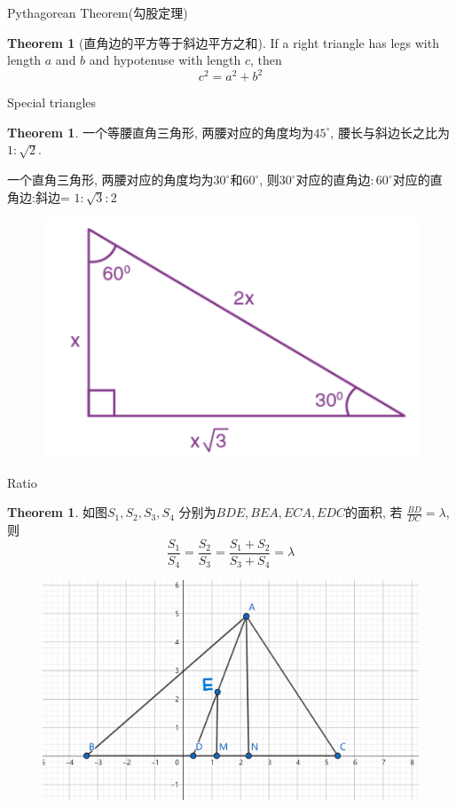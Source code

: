 \documentclass{beamer}
\theoremstyle{definition}
\newtheorem{theo}[defn]{Theorem}
\begin{document}
\begin{frame}{Pythagorean Theorem(勾股定理)}
    \begin{theo}[直角边的平方等于斜边平方之和]
        If a right triangle has legs with length $a$ and $b$ and hypotenuse with length $c$, then
        \begin{equation*}
            c^2=a^2+b^2
        \end{equation*}
    \end{theo}
\end{frame}
\begin{frame}{Special triangles}
    \begin{theo}
        一个等腰直角三角形, 两腰对应的角度均为$45^\circ$, 腰长与斜边长之比为$1:\sqrt{2}$.

        一个直角三角形, 两腰对应的角度均为$30^\circ$和$60^\circ$, 则$30^\circ$对应的直角边$:60^\circ$对应的直角边:斜边= $1:\sqrt{3}:2$
    \end{theo}
    \begin{figure}
        \includegraphics[height=0.4\textheight]{306090.png}
    \end{figure}
\end{frame}
\begin{frame}{Ratio}
    \begin{theo}
        如图$S_1,S_2,S_3,S_4$
        分别为$BDE,BEA,ECA,EDC$的面积,
        若 $\frac{B D}{D C}=\lambda$,
        则 $$\frac{S_1}{S_4}=\frac{S_2}{S_3}=\frac{S_1+S_2}{S_3+S_4}=\lambda$$
    \end{theo}
    \begin{figure}
        \includegraphics[height=0.4\textheight]{triangle3.png}
    \end{figure}
\end{frame}
\end{document}
